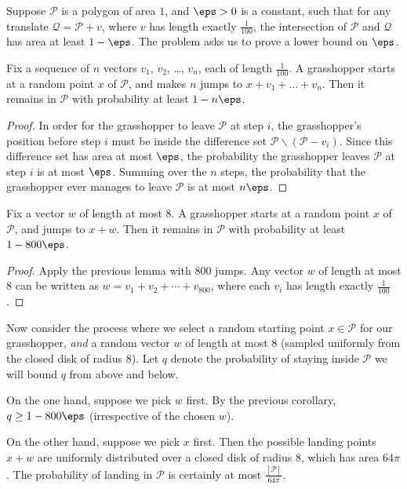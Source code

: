 \documentclass[11pt]{scrartcl}
\begin{document}
Suppose $\mathcal{P}$ is a polygon of area $1$,
and $\eps > 0$ is a constant,
such that for any translate $\mathcal{Q} = \mathcal{P} + v$,
where $v$ has length exactly $\frac{1}{100}$,
the intersection of $\mathcal{P}$ and $\mathcal{Q}$ has area at least $1 - \eps$.
The problem asks us to prove a lower bound on $\eps$.

\begin{lemma*}
  Fix a sequence of $n$ vectors
  $v_1$, $v_2$, \dots, $v_n$, each of length $\frac{1}{100}$.
  A grasshopper starts at a random point $x$ of $\mathcal{P}$,
  and makes $n$ jumps to $x + v_1 + \dots + v_n$.
  Then it remains in $\mathcal{P}$ with probability at least $1 - n\eps$.
\end{lemma*}

\begin{proof}
  In order for the grasshopper to leave $\mathcal{P}$ at step $i$,
  the grasshopper's position before step $i$
  must be inside the difference set $\mathcal{P} \backslash (\mathcal{P} - v_i)$.
  Since this difference set has area at most $\eps$,
  the probability the grasshopper leaves $\mathcal{P}$
  at step $i$ is at most $\eps$.
  Summing over the $n$ steps,
  the probability that the grasshopper
  ever manages to leave $\mathcal{P}$ is at most $n \eps$.
\end{proof}

\begin{corollary*}
  Fix a vector $w$ of length at most $8$.
  A grasshopper starts at a random point $x$ of $\mathcal{P}$,
  and jumps to $x + w$.
  Then it remains in $\mathcal{P}$ with probability at least $1 - 800 \eps$.
\end{corollary*}
\begin{proof}
  Apply the previous lemma with $800$ jumps.
  Any vector $w$ of length at most $8$
  can be written as $w = v_1 + v_2 + \dotsb + v_{800}$,
  where each $v_i$ has length exactly $\frac{1}{100}$.
\end{proof}

Now consider the process where we select a random
starting point $x \in \mathcal P$ for our grasshopper,
\emph{and} a random vector $w$ of length at most $8$
(sampled uniformly from the closed disk of radius $8$).
Let $q$ denote the probability of staying inside $\mathcal P$
we will bound $q$ from above and below.

\begin{itemize}
\ii On the one hand, suppose we pick $w$ first.
By the previous corollary, $q \ge 1 - 800\eps$
(irrespective of the chosen $w$).

\ii On the other hand, suppose we pick $x$ first.
Then the possible landing points $x + w$ are uniformly
distributed over a closed disk of radius $8$,
which has area $64\pi$.
The probability of landing in $\mathcal P$
is certainly at most $\frac{[\mathcal P]}{64\pi}$.
\end{itemize}
\end{document}
